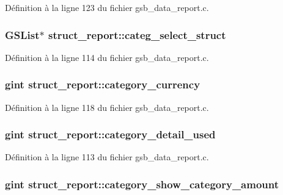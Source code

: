 Définition à la ligne 123 du fichier gsb\_\-data\_\-report.c.

\subsubsection[{categ\_\-select\_\-struct}]{\setlength{\rightskip}{0pt plus 5cm}GSList$\ast$ {\bf struct\_\-report::categ\_\-select\_\-struct}}\label{structstruct__report_a3388b6aeb744bb79ddda4c6c545c5067}


Définition à la ligne 114 du fichier gsb\_\-data\_\-report.c.

\subsubsection[{category\_\-currency}]{\setlength{\rightskip}{0pt plus 5cm}gint {\bf struct\_\-report::category\_\-currency}}\label{structstruct__report_a9e008bb362a5db0193c24232ad5c3af2}


Définition à la ligne 118 du fichier gsb\_\-data\_\-report.c.

\subsubsection[{category\_\-detail\_\-used}]{\setlength{\rightskip}{0pt plus 5cm}gint {\bf struct\_\-report::category\_\-detail\_\-used}}\label{structstruct__report_ae795793ee20fb3da567867b4ad6d99d9}


Définition à la ligne 113 du fichier gsb\_\-data\_\-report.c.

\subsubsection[{category\_\-show\_\-category\_\-amount}]{\setlength{\rightskip}{0pt plus 5cm}gint {\bf struct\_\-report::category\_\-show\_\-category\_\-amount}}\label{structstruct__report_a39d1ac3aa6fe5f696a8c04a64c16a158}


